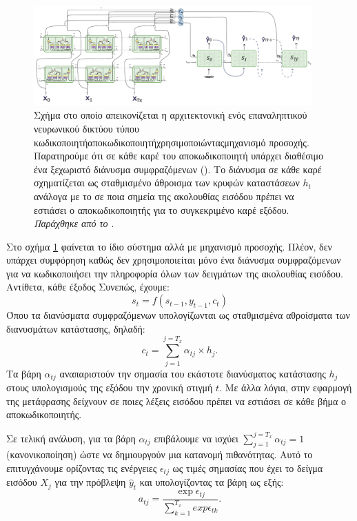 \begin{figure}[h]
  \centering
  \includegraphics[width=0.95\textwidth]{images/chapter theoritical background/rnn_peaky_encoder_decoder_with_attention.pdf}
  \caption{Σχήμα στο οποίο απεικονίζεται η αρχιτεκτονική ενός επαναληπτικού νευρωνικού δικτύου τύπου κωδικοποιητή\textendash αποκωδικοποιητήχρησιμοποιώνταςμηχανισμό προσοχής. Παρατηρούμε ότι σε κάθε καρέ του αποκωδικοποιητή υπάρχει διαθέσιμο ένα ξεχωριστό διάνυσμα συμφραζόμενων (). Το διάνυσμα σε κάθε καρέ σχηματίζεται ως σταθμισμένο άθροισμα των κρυφών καταστάσεων $h_t$ ανάλογα με το σε ποια σημεία της ακολουθίας εισόδου πρέπει να εστιάσει ο αποκωδικοποιητής για το συγκεκριμένο καρέ εξόδου. \textit{Παράχθηκε από το \href{https://inkscape.org/}{}}.}
  \label{fig:rnn_peaky_encoder_decoder_with_attention}
\end{figure}

Στο σχήμα \ref{fig:rnn_peaky_encoder_decoder_with_attention} φαίνεται το ίδιο σύστημα αλλά με μηχανισμό προσοχής. Πλέον, δεν υπάρχει συμφόρηση καθώς δεν χρησιμοποιείται μόνο ένα διάνυσμα συμφραζόμενων για να κωδικοποιήσει την πληροφορία όλων των δειγμάτων της ακολουθίας εισόδου. Αντίθετα, κάθε έξοδος  Συνεπώς, έχουμε:
\[
  s_t = f(s_{t-1}, y_{t-1}, c_t)
\]
Όπου τα διανύσματα συμφραζόμενων υπολογίζωνται ως σταθμισμένα αθροίσματα των διανυσμάτων κατάστασης, δηλαδή:
\[
  c_t = \sum_{j = 1}^{j=T_x} \alpha_{tj}\times h_j .
\]
Τα βάρη $\alpha_{tj}$ αναπαριστούν την σημασία του εκάστοτε διανύσματος κατάστασης $h_j$ στους υπολογισμούς της εξόδου την χρονική στιγμή $t$. Με άλλα λόγια, στην εφαρμογή της μετάφρασης δείχνουν σε ποιες λέξεις εισόδου πρέπει να εστιάσει σε κάθε βήμα ο αποκωδικοποιητής.\par

Σε τελική ανάλυση, για τα βάρη $\alpha_{tj}$ επιβάλουμε να ισχύει $\sum_{j = 1}^{j=T_x} \alpha_{tj} = 1$ (κανονικοποίηση) ώστε να δημιουργούν μια κατανομή πιθανότητας. Αυτό το επιτυγχάνουμε ορίζοντας τις ενέργειες $\epsilon_{tj}$ ως τιμές σημασίας που έχει το δείγμα εισόδου $X_j$ για την πρόβλεψη $\hat{y}_t$ και υπολογίζοντας τα βάρη ως εξής:
\[
  a_{tj} = \frac{\exp{\epsilon_{tj}}}{\sum_{k=1}^{T_x}exp{\epsilon_{tk}}}
.\]
\par

